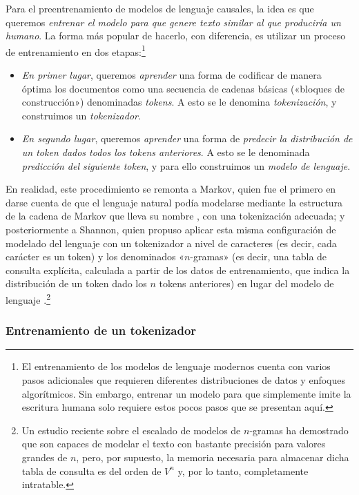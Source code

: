 \documentclass[../../book-main_es.tex]{subfiles}
\begin{document}
Para el preentrenamiento de modelos de lenguaje causales, la idea es que queremos
\textit{entrenar el modelo para que genere texto similar al que produciría un humano}. La forma más
popular de hacerlo, con diferencia, es utilizar un proceso de entrenamiento
en dos etapas:\footnote{El entrenamiento de los modelos de lenguaje modernos cuenta con varios
pasos adicionales que requieren diferentes distribuciones de datos
y enfoques algorítmicos. Sin embargo, entrenar un modelo para que simplemente imite
la escritura humana solo requiere estos pocos pasos que se presentan aquí.}
\begin{itemize}
\item \textit{En primer lugar}, queremos \textit{aprender} una forma de codificar de manera óptima
    los documentos como una secuencia de cadenas básicas («bloques de construcción»)
    denominadas \textit{tokens}. A esto se le denomina
    \textit{tokenización}, y construimos un \textit{tokenizador}.
\item \textit{En segundo lugar}, queremos \textit{aprender} una forma de
    \textit{predecir la distribución de un token dados todos los tokens anteriores}. 
    A esto se le denominada \textit{predicción del siguiente token}, y para ello
    construimos un \textit{modelo de lenguaje}.
\end{itemize}
En realidad, este procedimiento se remonta a Markov, quien fue el primero en darse cuenta de que
el lenguaje natural podía modelarse mediante la estructura de la cadena de Markov 
que lleva su nombre \citep{markov2006example}, con una
tokenización adecuada; y posteriormente a Shannon, quien propuso aplicar esta misma
configuración de modelado del lenguaje con un tokenizador a nivel de caracteres (es decir, cada
carácter es un token) y los denominados «\(n\)-gramas» (es decir, una
tabla de consulta explícita, calculada a partir de los datos de entrenamiento, que indica la distribución de
un token dado los \(n\) tokens anteriores) en lugar del modelo de lenguaje
\citep{Shannon-1948}.\footnote{Un estudio reciente
\citep{liu2024infini} sobre el escalado de modelos de \(n\)-gramas ha demostrado que
son capaces de modelar el texto con bastante precisión para valores grandes de \(n\), pero,
por supuesto, la memoria necesaria para almacenar dicha tabla de consulta es del orden de
\(V^{n}\) y, por lo tanto, completamente intratable.}

\subsubsection{Entrenamiento de un tokenizador}
\end{document}
